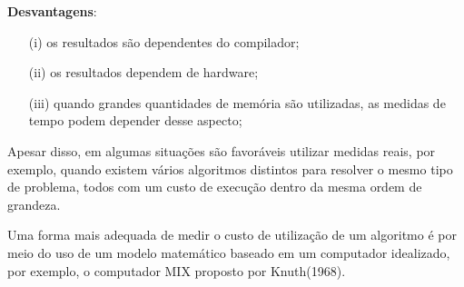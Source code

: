 \documentclass[10pt,a4paper]{article}
\begin{document}
\textbf{Desvantagens}:

\begin{itemize}
	
	\item[(i)] os resultados são dependentes do compilador;
	
	\item[(ii)] os resultados dependem de hardware;
	
	\item[(iii)] quando grandes quantidades de memória são utilizadas, as medidas de tempo 
	podem depender desse aspecto;
\end{itemize}

Apesar disso, em algumas situações são favoráveis utilizar medidas reais, por exemplo, quando 
existem vários algoritmos distintos para resolver o mesmo tipo de problema, todos com um custo
de execução dentro da mesma ordem de grandeza.

Uma forma mais adequada de medir o custo de utilização de um algoritmo é por meio do uso de 
um modelo matemático baseado em um computador idealizado, por exemplo, o computador MIX 
proposto por Knuth(1968). 
\end{document}
